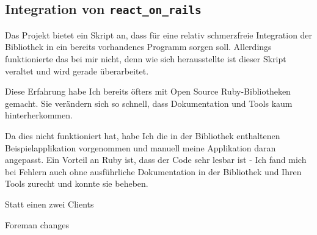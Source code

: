 \documentclass[a4paper,10pt]{scrartcl}
\begin{document}
  \subsection{Integration von \lstinline{react_on_rails}}

    Das Projekt bietet ein Skript an, dass für eine relativ schmerzfreie
    Integration der Bibliothek in ein bereits vorhandenes Programm sorgen soll.
    Allerdings funktionierte das bei mir nicht, denn wie sich herausstellte ist
    dieser Skript veraltet und wird gerade überarbeitet.

    Diese Erfahrung habe Ich bereits öfters mit Open Source Ruby-Bibliotheken
    gemacht.
    Sie verändern sich so schnell, dass Dokumentation und Tools kaum
    hinterherkommen.

    Da dies nicht funktioniert hat, habe Ich die in der Bibliothek
    enthaltenen Beispielapplikation vorgenommen und manuell meine Applikation
    daran angepasst.
    Ein Vorteil an Ruby ist, dass der Code sehr lesbar ist - Ich fand mich
    bei Fehlern auch ohne ausführliche Dokumentation in der Bibliothek und
    Ihren Tools zurecht und konnte sie beheben.

    Statt einen zwei Clients

    Foreman changes
\end{document}
